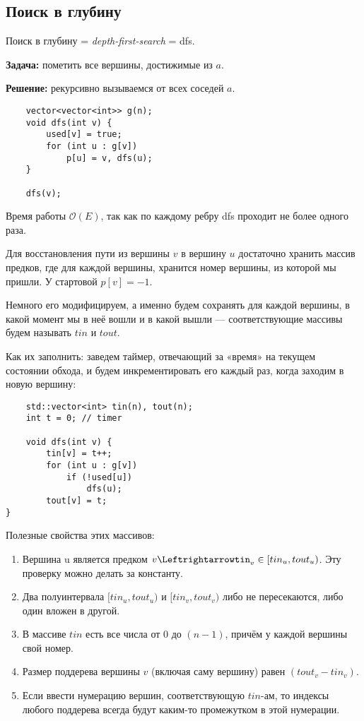 \subsection{Поиск в глубину}
Поиск в глубину = \textit{depth-first-search} = dfs.

\textbf{Задача:} пометить все вершины, достижимые из $a$.

\textbf{Решение:} рекурсивно вызываемся от всех соседей $a$.

\begin{lstlisting}
    vector<vector<int>> g(n);
    void dfs(int v) {
        used[v] = true;
        for (int u : g[v])
            p[u] = v, dfs(u);
    }

    dfs(v);
\end{lstlisting}

Время работы $\mathcal{O}(E)$, так как по каждому ребру dfs проходит не более одного раза.

Для восстановления пути из вершины $v$ в вершину $u$ достаточно хранить массив предков, где для каждой вершины, хранится номер вершины, из которой мы пришли. У стартовой $p[v]=-1$.

Немного его модифицируем, а именно будем сохранять для каждой вершины, в какой момент мы в неё вошли и в какой вышли — соответствующие массивы будем называть $tin$ и $tout$.

Как их заполнить: заведем таймер, отвечающий за «время» на текущем состоянии обхода, и будем инкрементировать его каждый раз, когда заходим в новую вершину:

\begin{lstlisting}
    std::vector<int> tin(n), tout(n);
    int t = 0; // timer

    void dfs(int v) {
        tin[v] = t++;
        for (int u : g[v])
            if (!used[u])
                dfs(u);
        tout[v] = t;
}
\end{lstlisting}

Полезные свойства этих массивов:
\begin{enumerate}
    \item Вершина u является предком $v\Leftrightarrowtin_v\in[tin_u, tout_u) $. Эту проверку можно делать за константу.
    \item Два полуинтервала $[tin_u, tout_u)$ и $[tin_v, tout_v)$ либо не пересекаются, либо один вложен в другой.
    \item В массиве $tin$ есть все числа от 0 до $(n-1)$, причём у каждой вершины свой номер.
    \item Размер поддерева вершины $v$ (включая саму вершину) равен $(tout_v-tin_v)$.
    \item Если ввести нумерацию вершин, соответствующую $tin$-ам, то индексы любого поддерева всегда будут каким-то промежутком в этой нумерации.
\end{enumerate}

